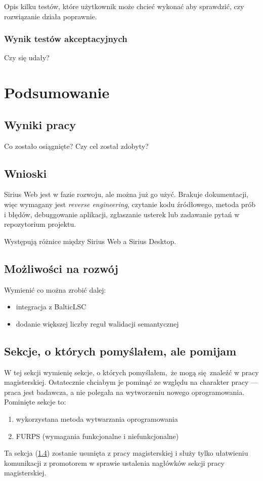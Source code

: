 Opis kilku testów, które użytkownik może chcieć wykonać aby sprawdzić, czy
rozwiązanie działa poprawnie.

\subsection{Wynik testów akceptacyjnych}

Czy się udały?

\chapter{Podsumowanie}

\section{Wyniki pracy}

Co zostało osiągnięte? Czy cel został zdobyty?

\section{Wnioski}

Sirius Web jest w fazie rozwoju, ale można już go użyć. Brakuje dokumentacji,
więc wymagany jest \textit{reverse engineering}, czytanie kodu źródłowego,
metoda prób i błędów, debuggowanie aplikacji, zgłaszanie usterek lub zadawanie
pytań w repozytorium projektu.

Występują różnice między Sirius Web a Sirius Desktop.

\section{Możliwości na rozwój}

Wymienić co można zrobić dalej:

\begin{itemize}
	\item integracja z BalticLSC
	\item dodanie większej liczby reguł walidacji semantycznej
\end{itemize}

\section{Sekcje, o których pomyślałem, ale pomijam}\label{sec:pominiete-sekcje}

W tej sekcji wymienię sekcje, o których pomyślałem, że mogą się znaleźć w pracy
magisterskiej. Ostatecznie chciabym je pominąć ze względu na charakter pracy
--- praca jest badawcza, a nie polegała na wytworzeniu nowego oprogramowania.
Pominięte sekcje to:

\begin{enumerate}
	\item wykorzystana metoda wytwarzania oprogramowania
	\item FURPS (wymagania funkcjonalne i niefunkcjonalne)
\end{enumerate}

Ta sekcja (\ref{sec:pominiete-sekcje}) zostanie usunięta z pracy magisterskiej
i służy tylko ułatwieniu komunikacji z promotorem w sprawie ustalenia nagłówków
sekcji pracy magisterskiej.
